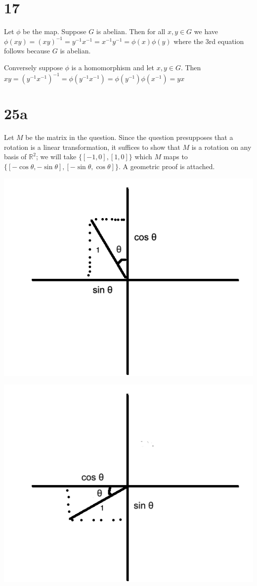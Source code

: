 \documentclass{article}
\def\R{\mathbb{R}}
\def\inv{{-1}}
\begin{document}
\section*{17}

Let $\phi$ be the map. Suppose $G$ is abelian. Then for all $x, y \in G$ we have $\phi(xy) = (xy)^\inv = y^\inv x^\inv = x^\inv y^\inv = \phi(x) \phi(y)$ where the 3rd equation follows because $G$ is abelian.

Conversely suppose $\phi$ is a homomorphism and let $x, y \in G$. Then $xy = (y^\inv x^\inv)^\inv = \phi(y^\inv x^\inv) = \phi(y^\inv) \phi(x^\inv) = yx$

\section*{25a}

Let $M$ be the matrix in the question. Since the question presupposes that a rotation is a linear transformation, it suffices to show that $M$ is a rotation on any basis of $\R^2$; we will take $\{[-1, 0], [1, 0]\}$ which $M$ maps to $\{[-\cos\theta, -\sin\theta], [-\sin\theta, \cos\theta]\}$. A geometric proof is attached.

\includegraphics[scale=0.65]{basis1.png}

\includegraphics[scale=0.65]{basis2.png}
\end{document}
